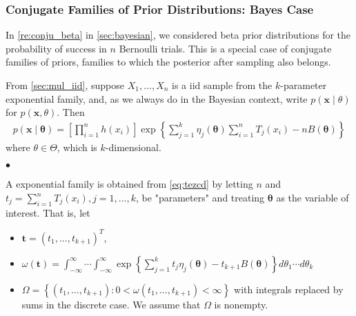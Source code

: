 \documentclass{article}
\begin{document}
\subsubsection{Conjugate Families of Prior Distributions: Bayes Case}

In \cref{re:conju_beta} in \cref{sec:bayesian}, we considered beta prior distributions for the probability of success in $n$ Bernoulli trials. This is a special case of conjugate families of priors, families to which the posterior after sampling also belongs.

From \cref{sec:mul_iid}, suppose $X_{1}, \ldots, X_{n}$ is a \gls{iid} sample from the $k$-parameter exponential family, and, as we always do in the Bayesian context, write $p(\mathbf{x} \mid \theta)$ for $p(\mathbf{x}, \theta)$. Then 
\begin{align}
p(\mathbf{x} \mid \boldsymbol{\theta})=\left[\prod_{i=1}^{n} h\left(x_{i}\right)\right] \exp \left\{\sum_{j=1}^{k} \eta_{j}(\boldsymbol{\theta}) \sum_{i=1}^{n} T_{j}\left(x_{i}\right)-n B(\boldsymbol{\theta})\right\}\label{eq:tezcd}
\end{align}
where $\theta \in \Theta$, which is $k$-dimensional. 

$\bullet$ 

 A  exponential family is obtained from \cref{eq:tezcd} by letting $n$ and $t_{j}=\sum_{i=1}^{n} T_{j}\left(x_{i}\right), j=1, \ldots, k$, be "parameters" and treating $\boldsymbol{\theta}$ as the variable of interest. That is, let
 \begin{itemize}
     \item  $\mathbf{t}=\left(t_{1}, \ldots, t_{k+1}\right)^{T}$,
     \item $\omega(\mathbf{t}) =\int_{-\infty}^{\infty} \cdots \int_{-\infty}^{\infty} \exp \left\{\sum_{j=1}^{k} t_{j} \eta_{j}(\boldsymbol{\theta})-t_{k+1} B(\boldsymbol{\theta})\right\} d \theta_{1} \cdots d \theta_{k}$
     \item $\Omega =\left\{\left(t_{1}, \ldots, t_{k+1}\right): 0<\omega\left(t_{1}, \ldots, t_{k+1}\right)<\infty\right\}$
     with integrals replaced by sums in the discrete case.  We assume that $\Omega$ is nonempty.
 \end{itemize}
\end{document}
